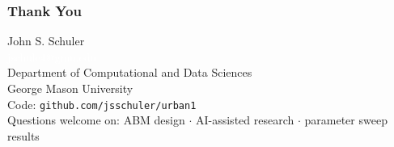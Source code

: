 \documentclass{beamer}
\begin{document}
\begin{frame}
  \frametitle{Thank You}
  \begin{center}
    \textcolor{nimbygray}{\large John S. Schuler}\\[0.4em]
    \textcolor{white}{jschule4@gmu.edu}\\[1em]
    \textcolor{nimbygray}{Department of Computational and Data Sciences\\
    George Mason University}\\[1.5em]
    \textcolor{nimbyyellow}{Code: \texttt{github.com/jsschuler/urban1}}\\[1em]
    \small Questions welcome on: ABM design $\cdot$ AI-assisted research $\cdot$ parameter sweep results
  \end{center}
\end{frame}
\end{document}

